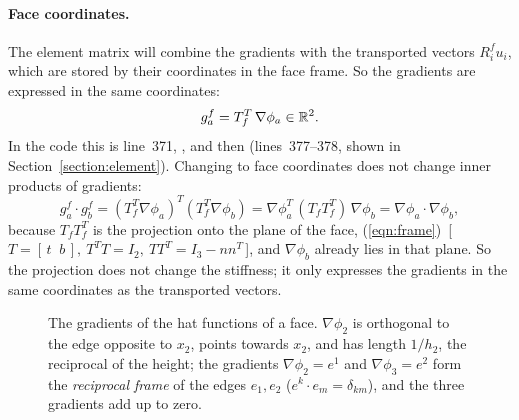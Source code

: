 \paragraph{Face coordinates.} The element matrix will combine the gradients with the transported vectors $R_i^f u_i$, which are stored by their coordinates in the face frame. So the gradients are expressed in the same coordinates:
\begin{equation}
\label{eqn:grad_face}
g_a^f = T_f^T\, \nabla \phi_a \in \mathbb{R}^2 .
\end{equation}
In the code this is line~371, , and then  (lines~377--378, shown in Section~\ref{section:element}). Changing to face coordinates does not change inner products of gradients:
\begin{equation*}
g_a^f \cdot g_b^f = (T_f^T \nabla\phi_a)^T (T_f^T\nabla\phi_b) = \nabla\phi_a^T\, (T_f T_f^T)\, \nabla\phi_b = \nabla\phi_a \cdot \nabla \phi_b ,
\end{equation*}
because $T_f T_f^T$ is the projection onto the plane of the face, (\ref{eqn:frame})~[\,$T = [\,t\;\;b\,],\ T^TT = I_2,\ TT^T = I_3 - nn^T$\,], and $\nabla\phi_b$ already lies in that plane. So the projection does not change the stiffness; it only expresses the gradients in the same coordinates as the transported vectors.
\begin{figure}[t]
\centering
{}
\caption{The gradients of the hat functions of a face. $\nabla \phi_2$ is orthogonal to the edge opposite to $x_2$, points towards $x_2$, and has length $1/h_2$, the reciprocal of the height; the gradients $\nabla\phi_2 = e^1$ and $\nabla\phi_3 = e^2$ form the \emph{reciprocal frame} of the edges $e_1, e_2$ ($e^k \cdot e_m = \delta_{km}$), and the three gradients add up to zero.}
\label{fig:gradient}
\end{figure}

